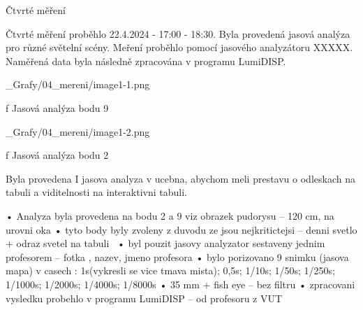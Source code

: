 \sec Čtvrté měření

Čtvrté měření proběhlo 22.4.2024 - 17:00 - 18:30. Byla provedená jasová analýza pro různé světelní scény. Meření proběhlo pomocí jasového analyzátoru XXXXX. Naměřená data byla následně zpracována v programu LumiDISP.

\medskip
\medskip {}
\picw=14cm _Grafy/04_mereni/image1-1.png
\caption/f Jasová analýza bodu 9
\medskip

\medskip
\medskip {}
\picw=14cm _Grafy/04_mereni/image1-2.png
\caption/f Jasová analýza bodu 2
\medskip
\medskip

Byla provedena I jasova analyza v ucebna, abychom meli prestavu o odleskach na tabuli a viditelnosti na interaktivni tabuli.

    • Analyza byla provedena na bodu 2 a 9 viz obrazek pudorysu – 120 cm, na urovni oka
    \medskip
    • tyto body byly zvoleny z duvodu ze jsou nejkritictejsi – denni svetlo + odraz svetel na tabuli\
    \medskip
    • byl pouzit jasovy analyzator sestaveny jednim profesorem – fotka , nazev, jmeno profesora
    \medskip
    • bylo porizovano 9 snimku (jasova mapa) v casech : 1s(vykresli se vice tmava mista); 0,5s; 1/10s; 1/50s; 1/250s; 1/1000s; 1/2000s; 1/4000s; 1/8000s
    \medskip
    • 35 mm + fish eye – bez filtru
    \medskip
    • zpracovani vysledku probehlo v programu LumiDISP – od profesoru z VUT




















